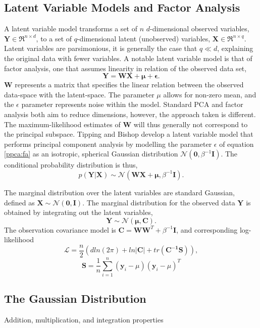 \documentclass[ %
                    author={Dillon Keith Diep [INCOMPLETE DRAFT, NOT FOR SUBMISSION]},
                supervisor={Dr. Carl Henrik Ek},
                    degree={MEng},
                     title={ARt-CG:},
                  subtitle={Assisted Real-time Content Generation of 3D Hair by Learning Manifolds},
                      type={Research},
                      year={2014} ]{dissertation}
\begin{document}
\subsection{Latent Variable Models and Factor Analysis}
A latent variable model transforms a set of $n$ $d$-dimensional observed variables, $\mathbf{Y}\in\Re^{n \times d}$, to a set of $q$-dimensional latent (unobserved) variables, $\mathbf{X}\in\Re^{n \times q}$. Latent variables are parsimonious, it is generally the case that $q \ll d$, explaining the original data with fewer variables. A notable latent variable model is that of factor analysis, one that assumes linearity in relation of the observed data set,
\begin{equation} \label{ppca:fa}
	\mathbf{Y=WX+\mu+\epsilon}.
\end{equation}
$\mathbf{W}$ represents a matrix that specifies the linear relation between the observed data-space with the latent-space.
The parameter $\mu$ allows for non-zero mean, and the $\epsilon$ parameter represents noise within the model. Standard PCA and factor analysis both aim to reduce dimensions, however, the approach taken is different. The maximum-likelihood estimates of $\mathbf{W}$ will thus generally not correspond to the principal subspace. Tipping and Bishop develop a latent variable model that performs principal component analysis by modelling the parameter $\epsilon$ of equation \ref{ppca:fa} as an isotropic, spherical Gaussian distribution $\mathcal{N}(\mathbf{0},\beta^{-1}\mathbf{I})$. The conditional probability distribution is thus,
\begin{equation} \label{ppca:conditional}
	p(\mathbf{Y|X})\sim\mathcal{N}(\mathbf{WX+\mu},\beta^{-1}\mathbf{I}). 
\end{equation}

The marginal distribution over the latent variables are standard Gaussian, defined as $\mathbf{X\sim\mathcal{N}(0,I)}$. The marginal distribution for the observed data $\mathbf{Y}$ is obtained by integrating out the latent variables,
$$\mathbf{Y}\sim\mathcal{N}\mathbf{(\mu,C)}.$$
The observation covariance model is $\mathbf{C=WW}^T+\beta^{-1}\mathbf{I}$, and corresponding log-likelihood
\begin{equation} \label{ppca:loglikelihood}
	\mathcal{L}=\frac{n}{2}(d ln(2\pi)+ln|\mathbf{C}|+tr(\mathbf{C^{-1}S})),
\end{equation}
$$\mathbf{S}=\frac{1}{n}\sum^n_{i=1}(\mathbf{y}_i-\mu)(\mathbf{y}_i-\mu)^T$$

{\color{red}

\subsection{The Gaussian Distribution}
Addition, multiplication, and integration properties
}
\end{document}
